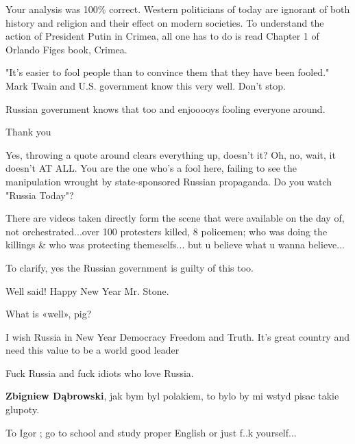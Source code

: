 \begin{itemize}
\begin{itemize}
\end{itemize} %


Your analysis was 100\% correct. Western politicians of today are ignorant of
both history and religion and their effect on modern societies. To understand
the action of President Putin in Crimea, all one has to do is read Chapter 1 of
Orlando Figes book, Crimea.



"It's easier to fool people than to convince them that they have been fooled."
Mark Twain and U.S. government know this very well. Don't stop.

\begin{itemize} %
Russian government knows that too and enjooooys fooling everyone around.

Thank you


Yes, throwing a quote around clears everything up, doesn't it? Oh, no, wait, it
doesn't AT ALL. You are the one who's a fool here, failing to see the
manipulation wrought by state-sponsored Russian propaganda. Do you watch
"Russia Today"?


There are videos taken directly form the scene that were available on the day of, not orchestrated...over 100 protesters killed, 8 policemen; who was doing the killings \& who was protecting themeselfs... but u believe what u wanna believe...

To clarify, yes the Russian government is guilty of this too.
\end{itemize} %

Well said!
Happy New Year Mr. Stone.

\begin{itemize} %
What is «well», pig?

I wish Russia in New Year Democracy Freedom and Truth. It's great country and need this value to be a world good leader

Fuck Russia and fuck idiots who love Russia.

\textbf{Zbigniew Dąbrowski}, jak bym byl polakiem, to bylo by mi wstyd pisac takie glupoty.

To Igor ; go to school and study proper English or just f..k yourself...


\end{itemize}
\end{itemize}
